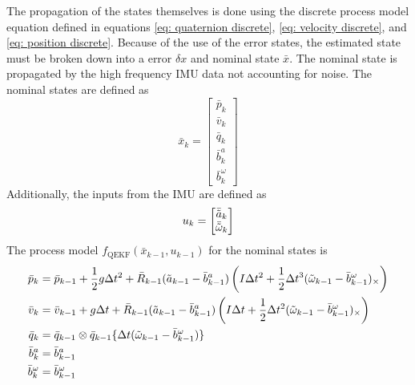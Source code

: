 The propagation of the states themselves is done using the discrete process model equation defined in equations \eqref{eq: quaternion discrete}, \eqref{eq: velocity discrete}, and \eqref{eq: position discrete}. Because of the use of the error states, the estimated state must be broken down into a error $\delta x$ and nominal state $\bar{x}$. The nominal state is propagated by the high frequency IMU data not accounting for noise. The nominal states are defined as
\begin{equation}
    \bar{x}_k = \begin{bmatrix}
            \bar{p}_k \\
            \bar{v}_k \\
            \bar{q}_k \\
            \bar{b}^a_k \\
            \bar{b}^{\omega}_k
        \end{bmatrix} 
    \label{eq: nominal x vec}
\end{equation}
Additionally, the inputs from the IMU are defined as
\begin{equation}
        u_k = \begin{bmatrix}
            \bar{\Tilde{a}}_k \\
            \bar{\Tilde{\omega}}_k \\
        \end{bmatrix} 
    \label{eq: inputs IMU quaternion}
\end{equation}
The process model $f_{\text{QEKF}}(\bar{x}_{k-1},u_{k-1})$ for the nominal states is
\begin{subequations}
    \label{eq: f nominal quaternion}
    \begin{align}
        \bar{p}_k &= \bar{p}_{k-1} + \frac{1}{2} g \Delta t^2 + \bar{R}_{k-1} (\Tilde{a}_{k-1} - \bar{b}^{a}_{k-1}) 
        \left( I \Delta t^2 + \frac{1}{2} \Delta t^3 (\Tilde{\omega}_{k-1} - \bar{b}^{\omega}_{k-1})_{\times} \right) \label{eq:p for f a} \\
        \bar{v}_k &= \bar{v}_{k-1} + g \Delta t + \bar{R}_{k-1} (\Tilde{a}_{k-1} - \bar{b}^{a}_{k-1}) 
        \left( I \Delta t + \frac{1}{2} \Delta t^2 (\Tilde{\omega}_{k-1} - \bar{b}^{\omega}_{k-1})_{\times} \right) \label{eq:v for f b} \\
        \bar{q}_k &= 
        \bar{q}_{k-1} \otimes \bar{q}_{k-1}\{\Delta t(\Tilde{\omega}_{k-1} - \bar{b}^{\omega}_{k-1})\} \label{eq:q for f c}\\
        \bar{b}^{a}_{k} &= \bar{b}^{a}_{k-1} \label{eq:b^a for f d} \\
        \bar{b}^{\omega}_{k} &= \bar{b}^{\omega}_{k-1} \label{eq:b^(omega) for f d}
    \end{align}
\end{subequations}

